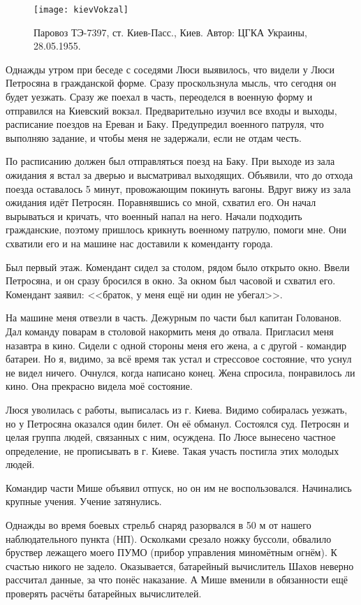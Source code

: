 \begin{wrapfigure}{O}{.4\textwidth}
\centering
\texttt{[image: kievVokzal]}
\caption{Паровоз ТЭ-7397, ст. Киев-Пасс., Киев. Автор: ЦГКА Украины, 28.05.1955.}
\label{fig:kievVokzal}
\end{wrapfigure}

Однажды утром при беседе с соседями Люси выявилось, что видели у Люси Петросяна в гражданской форме. Сразу проскользнула мысль, что сегодня он будет уезжать. Сразу же поехал в часть, переоделся в военную форму и отправился на Киевский вокзал. Предварительно изучил все входы и выходы, расписание поездов на Ереван и Баку. Предупредил военного патруля, что выполняю задание, и чтобы меня не задержали, если не отдам честь. 

По расписанию должен был отправляться поезд на Баку. При выходе из зала ожидания я встал за дверью и высматривал выходящих. Объявили, что до отхода поезда оставалось 5 минут, провожающим покинуть вагоны. Вдруг вижу из зала ожидания идёт Петросян. Поравнявшись со мной, схватил его. Он начал вырываться и кричать, что военный напал на него. Начали подходить гражданские, поэтому пришлось крикнуть военному патрулю, помоги мне. Они схватили его и на машине нас доставили к коменданту города. 

Был первый этаж. Комендант сидел за столом, рядом было открыто окно. Ввели Петросяна, и он сразу бросился в окно. За окном был часовой и схватил его. Комендант заявил: <<браток, у меня ещё ни один не убегал>>. 

На машине меня отвезли в часть. Дежурным по части был капитан Голованов. Дал команду поварам в столовой накормить меня до отвала. Пригласил меня назавтра в кино. Сидели с одной стороны меня его жена, а с другой - командир батареи. Но я, видимо, за всё время так устал и стрессовое состояние, что уснул не видел ничего. Очнулся, когда написано конец. Жена спросила, понравилось ли кино. Она прекрасно видела моё состояние. 

Люся уволилась с работы, выписалась из г. Киева. Видимо собиралась уезжать, но у Петросяна оказался один билет. Он её обманул. Состоялся суд. Петросян и целая группа людей, связанных с ним, осуждена. По Люсе вынесено частное определение, не прописывать в г. Киеве. Такая участь постигла этих молодых людей.

Командир части Мише объявил отпуск, но он им не воспользовался. Начинались крупные учения. Учение затянулись.

Однажды во время боевых стрельб снаряд разорвался в 50 м от нашего наблюдательного пункта (НП). Осколками срезало ножку буссоли, обвалило бруствер лежащего моего ПУМО (прибор управления миномётным огнём). К счастью никого не задело. Оказывается, батарейный вычислитель Шахов неверно рассчитал данные, за что понёс наказание. А Мише вменили в обязанности ещё проверять расчёты батарейных вычислителей. 

